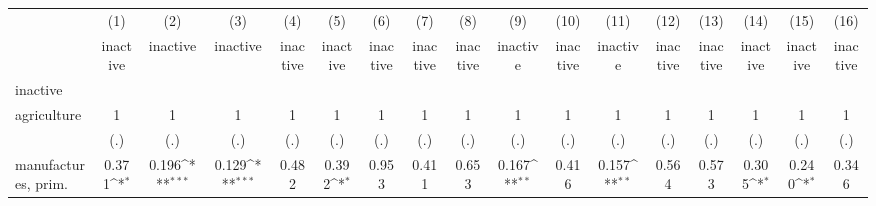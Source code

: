 {
\def\sym#1{\ifmmode^{#1}\else\(^{#1}\)\fi}
\begin{tabular}{l*{16}{c}}
\hline\hline
                    &\multicolumn{1}{c}{(1)}&\multicolumn{1}{c}{(2)}&\multicolumn{1}{c}{(3)}&\multicolumn{1}{c}{(4)}&\multicolumn{1}{c}{(5)}&\multicolumn{1}{c}{(6)}&\multicolumn{1}{c}{(7)}&\multicolumn{1}{c}{(8)}&\multicolumn{1}{c}{(9)}&\multicolumn{1}{c}{(10)}&\multicolumn{1}{c}{(11)}&\multicolumn{1}{c}{(12)}&\multicolumn{1}{c}{(13)}&\multicolumn{1}{c}{(14)}&\multicolumn{1}{c}{(15)}&\multicolumn{1}{c}{(16)}\\
                    &\multicolumn{1}{c}{inactive}&\multicolumn{1}{c}{inactive}&\multicolumn{1}{c}{inactive}&\multicolumn{1}{c}{inactive}&\multicolumn{1}{c}{inactive}&\multicolumn{1}{c}{inactive}&\multicolumn{1}{c}{inactive}&\multicolumn{1}{c}{inactive}&\multicolumn{1}{c}{inactive}&\multicolumn{1}{c}{inactive}&\multicolumn{1}{c}{inactive}&\multicolumn{1}{c}{inactive}&\multicolumn{1}{c}{inactive}&\multicolumn{1}{c}{inactive}&\multicolumn{1}{c}{inactive}&\multicolumn{1}{c}{inactive}\\
\hline
inactive            &                     &                     &                     &                     &                     &                     &                     &                     &                     &                     &                     &                     &                     &                     &                     &                     \\
agriculture         &           1         &           1         &           1         &           1         &           1         &           1         &           1         &           1         &           1         &           1         &           1         &           1         &           1         &           1         &           1         &           1         \\
                    &         (.)         &         (.)         &         (.)         &         (.)         &         (.)         &         (.)         &         (.)         &         (.)         &         (.)         &         (.)         &         (.)         &         (.)         &         (.)         &         (.)         &         (.)         &         (.)         \\
[1em]
manufactures, prim. &       0.371\sym{*}  &       0.196\sym{***}&       0.129\sym{***}&       0.482         &       0.392\sym{*}  &       0.953         &       0.411         &       0.653         &       0.167\sym{**} &       0.416         &       0.157\sym{**} &       0.564         &       0.573         &       0.305\sym{*}  &       0.240\sym{*}  &       0.346         \\

\end{tabular}}
